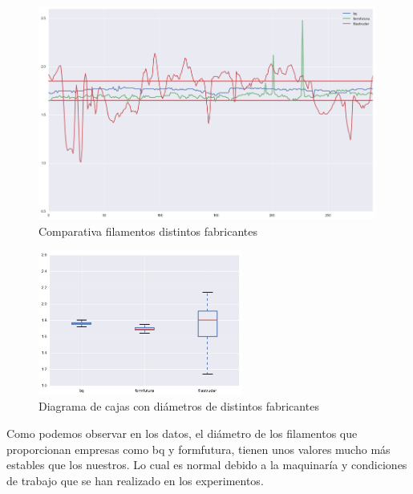 \begin{figure}[H]
    \centering
    \includegraphics[width=0.99\textwidth]{images/producciones/conclusiones/output_8_1.png}
    \caption{Comparativa filamentos distintos fabricantes}
    \label{fig:concl_graf5}
\end{figure}

\begin{figure}[H]
    \centering
    \includegraphics[width=0.6\textwidth]{images/producciones/conclusiones/output_9_1.png}
    \caption{Diagrama de cajas con diámetros de distintos fabricantes}
    \label{fig:concl_cajas5}
\end{figure}

Como podemos observar en los datos, el diámetro de los filamentos que proporcionan empresas como bq y formfutura, tienen unos valores mucho más estables que los nuestros. Lo cual es normal debido a la maquinaría y condiciones de trabajo que se han realizado en los experimentos.\\